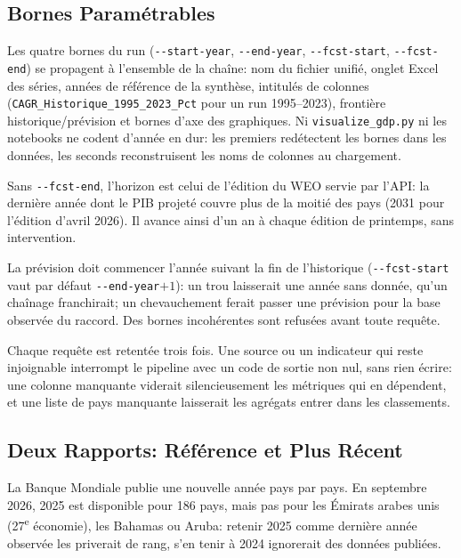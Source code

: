 \documentclass[11pt,a4paper]{article}
\begin{document}
\subsection{Bornes Paramétrables}
Les quatre bornes du run (\texttt{-{}-start-year}, \texttt{-{}-end-year}, \texttt{-{}-fcst-start}, \texttt{-{}-fcst-end}) se propagent à l'ensemble de la chaîne: nom du fichier unifié, onglet Excel des séries, années de référence de la synthèse, intitulés de colonnes (\texttt{CAGR\_Historique\_1995\_2023\_Pct} pour un run 1995--2023), frontière historique/prévision et bornes d'axe des graphiques. Ni \texttt{visualize\_gdp.py} ni les notebooks ne codent d'année en dur: les premiers redétectent les bornes dans les données, les seconds reconstruisent les noms de colonnes au chargement.

Sans \texttt{-{}-fcst-end}, l'horizon est celui de l'édition du WEO servie par l'API: la dernière année dont le PIB projeté couvre plus de la moitié des pays (2031 pour l'édition d'avril 2026). Il avance ainsi d'un an à chaque édition de printemps, sans intervention.

La prévision doit commencer l'année suivant la fin de l'historique (\texttt{-{}-fcst-start} vaut par défaut \texttt{-{}-end-year}$+1$): un trou laisserait une année sans donnée, qu'un chaînage franchirait; un chevauchement ferait passer une prévision pour la base observée du raccord. Des bornes incohérentes sont refusées avant toute requête.

Chaque requête est retentée trois fois. Une source ou un indicateur qui reste injoignable interrompt le pipeline avec un code de sortie non nul, sans rien écrire: une colonne manquante viderait silencieusement les métriques qui en dépendent, et une liste de pays manquante laisserait les agrégats entrer dans les classements.

\subsection{Deux Rapports: Référence et Plus Récent}
La Banque Mondiale publie une nouvelle année pays par pays. En septembre 2026, 2025 est disponible pour 186 pays, mais pas pour les Émirats arabes unis (27\textsuperscript{e} économie), les Bahamas ou Aruba: retenir 2025 comme dernière année observée les priverait de rang, s'en tenir à 2024 ignorerait des données publiées.
\end{document}
